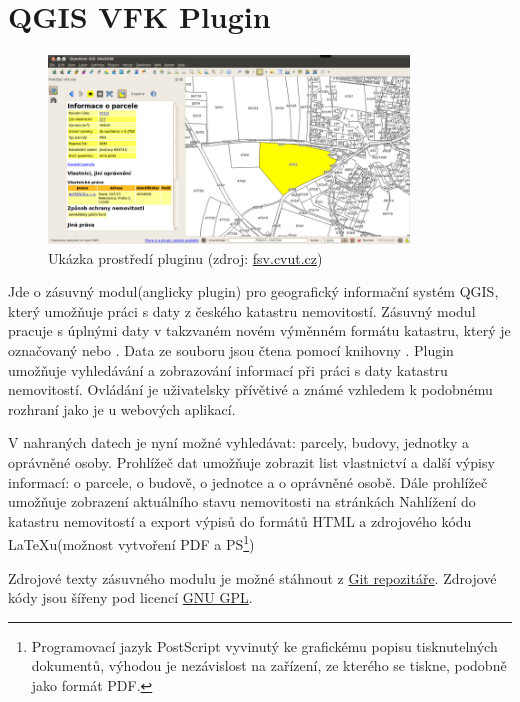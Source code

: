 \section{QGIS VFK Plugin}
\begin{figure}[H]
	 \centering
      \includegraphics[height=5cm]{./pictures/Qgisvfkplugin.png}
      \caption{Ukázka prostředí pluginu (zdroj:
\href{http://freegis.fsv.cvut.cz/wiki/images/4/4b/Qgisvfkplugin-screenshot-05.png}{fsv.cvut.cz})}
      \label{fig:qgis_vfk_plugin}
  \end{figure}

Jde o zásuvný modul(anglicky plugin) pro geografický informační systém
QGIS, který umožňuje práci s daty z českého katastru
nemovitostí. Zásuvný modul pracuje s úplnými daty v takzvaném novém
výměnném formátu katastru, který je označovaný  nebo
. Data ze souboru jsou čtena pomocí knihovny . Plugin
umožňuje vyhledávání a zobrazování informací při práci s daty katastru
nemovitostí. Ovládání je uživatelsky přívětivé a známé vzhledem k
podobnému rozhraní jako je u webových aplikací.

V nahraných datech je nyní možné vyhledávat: parcely, budovy, jednotky
a oprávněné osoby. Prohlížeč dat umožňuje zobrazit list vlastnictví a
další výpisy informací: o parcele, o budově, o jednotce a o oprávněné
osobě. Dále prohlížeč umožňuje zobrazení aktuálního stavu nemovitosti
na stránkách Nahlížení do katastru nemovitostí a export výpisů do
formátů HTML a zdrojového kódu LaTeXu(možnost vytvoření PDF a
PS\footnote{Programovací jazyk PostScript vyvinutý ke grafickému
  popisu tisknutelných dokumentů, výhodou je nezávislost na zařízení,
  ze kterého se tiskne, podobně jako formát PDF.\cite{PostScript}})

Zdrojové texty zásuvného modulu je možné stáhnout z
\href{https://github.com/ctu-geoforall-lab/qgis-vfk-plugin}{Git
  repozitáře}. Zdrojové kódy jsou šířeny pod licencí
\href{https://raw.githubusercontent.com/ctu-osgeorel/qgis-vfk-plugin/master/LICENSE}{GNU
  GPL}.

